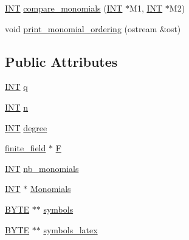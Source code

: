 \begin{DoxyCompactItemize}
\item 
\mbox{\hyperlink{galois_8h_a09fddde158a3a20bd2dcadb609de11dc}{I\+NT}} \mbox{\hyperlink{classhomogeneous__polynomial__domain_a05c5959cb62502954c9cf93a85b8c019}{compare\+\_\+monomials}} (\mbox{\hyperlink{galois_8h_a09fddde158a3a20bd2dcadb609de11dc}{I\+NT}} $\ast$M1, \mbox{\hyperlink{galois_8h_a09fddde158a3a20bd2dcadb609de11dc}{I\+NT}} $\ast$M2)
\item 
void \mbox{\hyperlink{classhomogeneous__polynomial__domain_aeb98c95ca555e4d24b62fe336731c190}{print\+\_\+monomial\+\_\+ordering}} (ostream \&ost)
\end{DoxyCompactItemize}
\subsection*{Public Attributes}
\begin{DoxyCompactItemize}
\item 
\mbox{\hyperlink{galois_8h_a09fddde158a3a20bd2dcadb609de11dc}{I\+NT}} \mbox{\hyperlink{classhomogeneous__polynomial__domain_aeded5c03d68fa173a12c512b93799e02}{q}}
\item 
\mbox{\hyperlink{galois_8h_a09fddde158a3a20bd2dcadb609de11dc}{I\+NT}} \mbox{\hyperlink{classhomogeneous__polynomial__domain_a7b4d50bcc15155a804439939a34b30ef}{n}}
\item 
\mbox{\hyperlink{galois_8h_a09fddde158a3a20bd2dcadb609de11dc}{I\+NT}} \mbox{\hyperlink{classhomogeneous__polynomial__domain_a74fc862c607381314ad8a0b3ea3df387}{degree}}
\item 
\mbox{\hyperlink{classfinite__field}{finite\+\_\+field}} $\ast$ \mbox{\hyperlink{classhomogeneous__polynomial__domain_abaa7cb4dfd33aa7726c0482ad85bc5c1}{F}}
\item 
\mbox{\hyperlink{galois_8h_a09fddde158a3a20bd2dcadb609de11dc}{I\+NT}} \mbox{\hyperlink{classhomogeneous__polynomial__domain_a2cf9125d4855499424ea13ce56804103}{nb\+\_\+monomials}}
\item 
\mbox{\hyperlink{galois_8h_a09fddde158a3a20bd2dcadb609de11dc}{I\+NT}} $\ast$ \mbox{\hyperlink{classhomogeneous__polynomial__domain_add92d0c8e5f86dfa938b3fadf3ea1814}{Monomials}}
\item 
\mbox{\hyperlink{galois_8h_ab6cc7b4aeb6ea31aba2b3fbfc83ff5e6}{B\+Y\+TE}} $\ast$$\ast$ \mbox{\hyperlink{classhomogeneous__polynomial__domain_a1721e4b7d9eaedb7741e1c87399429c0}{symbols}}
\item 
\mbox{\hyperlink{galois_8h_ab6cc7b4aeb6ea31aba2b3fbfc83ff5e6}{B\+Y\+TE}} $\ast$$\ast$ \mbox{\hyperlink{classhomogeneous__polynomial__domain_aab086f59c8b367e7f67a90fe64e6dc51}{symbols\+\_\+latex}}

\end{DoxyCompactItemize}
